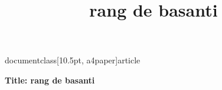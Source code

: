 
documentclass[10.5pt, a4paper]{article}
\usepackage{amsfonts}
\usepackage[top=0.3in,left=0.2in,right=0.2in]{geometry}
\usepackage{times}
\usepackage{tabularx}
\title{rang de basanti}

\maketitle
\textbf{Title: rang de basanti}

